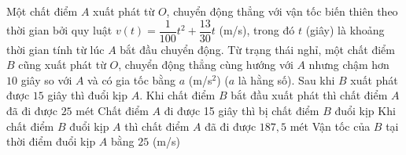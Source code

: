 \begin{ex}
	Một chất điểm $A$ xuất phát từ $O$, chuyển động thẳng với vận tốc biến thiên theo thời gian bởi quy luật $v(t)=\dfrac{1}{100}t^2+\dfrac{13}{30}t$ (m/s), trong đó $t$ (giây) là khoảng thời gian tính từ lúc $A$ bắt đầu chuyển động. Từ trạng thái nghỉ, một chất điểm $B$ cũng xuất phát từ $O$, chuyển động thẳng cùng hướng với $A$ nhưng chậm hơn $10$ giây so với $A$ và có gia tốc bằng $a$ (m/{s}$^2$) ($a$ là hằng số). Sau khi $B$ xuất phát được $15$ giây thì đuổi kịp $A$. 
	\choiceTF
	{\True Khi chất điểm $B$ bắt đầu xuất phát thì chất điểm $A$ đã đi được $25$ mét}
	{Chất điểm $A$ đi được 15 giây thì bị chất điểm $B$ đuổi kịp}
	{\True Khi chất điểm $B$ đuổi kịp $A$ thì chất điểm $A$ đã đi được $187,5$ mét}
	{\True Vận tốc của $B$ tại thời điểm đuổi kịp $A$ bằng $25$ (m/s)}
\end{ex}

